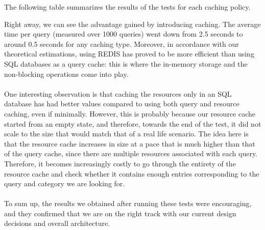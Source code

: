 The following table summarizes the results of the tests for each caching policy.
\begin{table}[h]
\centering
{}
\caption{Performance Evaluation Results}
\end{table}
\newpage
\noindent Right away, we can see the advantage gained by introducing caching. The average time per query (measured over 1000 queries) went down from 2.5 seconds to around 0.5 seconds for any caching type. Moreover, in accordance with our theoretical estimations, using REDIS has proved to be more efficient than using SQL databases as a query cache: this is where the in-memory storage and the non-blocking operations come into play.\\\\
One interesting observation is that caching the resources only in an SQL database has had better values compared to using both query and resource caching, even if minimally. However, this is probably because our resource cache started from an empty state, and therefore, towards the end of the test, it did not scale to the size that would match that of a real life scenario. The idea here is that the resource cache increases in size at a pace that is much higher than that of the query cache, since there are multiple resources associated with each query. Therefore, it becomes increasingly costly to go through the entirety of the resource cache and check whether it contains enough entries corresponding to the query and category we are looking for.\\\\
To sum up, the results we obtained after running these tests were encouraging, and they confirmed that we are on the right track with our current design decisions and overall architecture.
